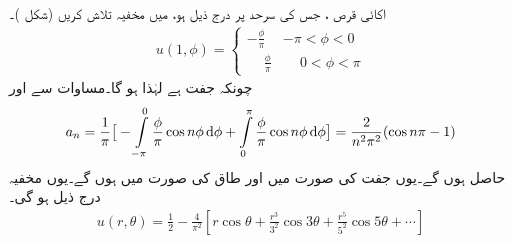 \quad {}\\
اکائی قرص ، جس کی سرحد پر درج ذیل ہو، میں مخفیہ  تلاش کریں (شکل )۔
\begin{align*}
u(1,\phi)=
\begin{cases}
-\frac{\phi}{\pi}& -\pi<\phi<0\\[0.5ex]
\phantom{-}\frac{\phi}{\pi}& \phantom{-}0<\phi<\pi
\end{cases}
\end{align*}
چونکہ   جفت ہے لہٰذا  ہو گا۔مساوات  سے  اور
\begin{align*}
a_n=\frac{1}{\pi}\big[-\int\limits_{-\pi}^{0}\frac{\phi}{\pi}\cos n\phi \dif \phi+\int\limits_{0}^{\pi}\frac{\phi}{\pi}\cos n\phi \dif \phi\big]=\frac{2}{n^2\pi^2}(\cos n\pi-1)
\end{align*}
حاصل ہوں گے۔یوں جفت  کی صورت میں  اور طاق  کی صورت میں  ہوں گے۔یوں مخفیہ درج ذیل ہو گی۔
\begin{align*}
u(r,\theta)=\frac{1}{2}-\frac{4}{\pi^2}[r\cos\theta+\frac{r^3}{3^2}\cos 3\theta+\frac{r^5}{5^2}\cos 5\theta+\cdots]
\end{align*} 
%
